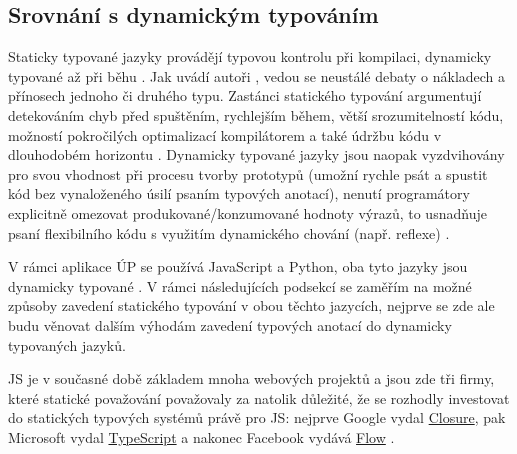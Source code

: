 \subsection{Srovnání s dynamickým typováním}

Staticky typované jazyky provádějí typovou kontrolu při kompilaci, dynamicky typované až při běhu \cite{types-study}. Jak uvádí autoři \cite{types-study}, vedou se neustálé debaty o nákladech a přínosech jednoho či druhého typu. Zastánci statického typování argumentují detekováním chyb před spuštěním, rychlejším během, větší srozumitelností kódu, možností pokročilých optimalizací kompilátorem \cite{types-study} a také údržbu kódu v dlouhodobém horizontu \cite{types-developerhowto}. Dynamicky typované jazyky jsou naopak vyzdvihovány pro svou vhodnost při procesu tvorby prototypů (umožní rychle psát a spustit kód bez vynaloženého úsilí psaním typových anotací), nenutí programátory explicitně omezovat produkované/konzumované hodnoty výrazů, to usnadňuje psaní flexibilního kódu s využitím dynamického chování (např. reflexe) \cite{types-study}.

V rámci aplikace ÚP se používá JavaScript a Python, oba tyto jazyky jsou dynamicky typované \cite{bp}. V rámci následujících podsekcí se zaměřím na možné způsoby zavedení statického typování v obou těchto jazycích, nejprve se zde ale budu věnovat dalším výhodám zavedení typových anotací do dynamicky typovaných jazyků.

JS je v současné době základem mnoha webových projektů a jsou zde tři firmy, které statické považování považovaly za natolik důležité, že se rozhodly investovat do statických typových systémů právě pro JS: nejprve Google vydal \href{https://developers.google.com/closure/compiler/}{Closure}, pak Microsoft vydal \href{https://www.typescriptlang.org/}{TypeScript} a nakonec Facebook vydává \href{https://flow.org/}{Flow} \cite{types-study}.

